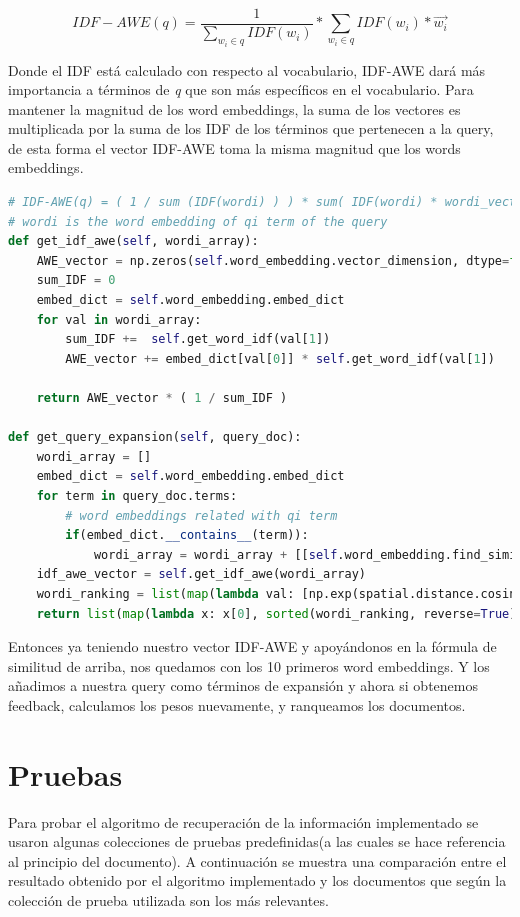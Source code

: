 \documentclass{llncs}
\begin{document}
$$ IDF-AWE(q) = \frac{1}{\sum_{w_i \in q} IDF(w_i)} * \sum_{w_i \in q} IDF(w_i) * \vec{w_i}$$


Donde el IDF está calculado con respecto al vocabulario, IDF-AWE dará más importancia a términos de \textit{q} que son más específicos en el vocabulario. Para mantener la magnitud de los word embeddings, la suma de los vectores es multiplicada por la suma de los IDF de los términos que pertenecen a la query, de esta forma el vector IDF-AWE toma la misma magnitud que los words embeddings.

\begin{lstlisting}[language=Python]
# IDF-AWE(q) = ( 1 / sum (IDF(wordi) ) ) * sum( IDF(wordi) * wordi_vector )
# wordi is the word embedding of qi term of the query
def get_idf_awe(self, wordi_array):
    AWE_vector = np.zeros(self.word_embedding.vector_dimension, dtype=float)
    sum_IDF = 0
    embed_dict = self.word_embedding.embed_dict
    for val in wordi_array:
        sum_IDF +=  self.get_word_idf(val[1])
        AWE_vector += embed_dict[val[0]] * self.get_word_idf(val[1])

    return AWE_vector * ( 1 / sum_IDF )

def get_query_expansion(self, query_doc):
    wordi_array = []
    embed_dict = self.word_embedding.embed_dict
    for term in query_doc.terms:
        # word embeddings related with qi term
        if(embed_dict.__contains__(term)):
            wordi_array = wordi_array + [[self.word_embedding.find_similar_word_kdtree(embed_dict[term])[0], term]]
    idf_awe_vector = self.get_idf_awe(wordi_array)
    wordi_ranking = list(map(lambda val: [np.exp(spatial.distance.cosine(embed_dict[val[0]], idf_awe_vector)), val[0]], wordi_array))
    return list(map(lambda x: x[0], sorted(wordi_ranking, reverse=True)))
\end{lstlisting}

Entonces ya teniendo nuestro vector IDF-AWE y apoyándonos en la fórmula de similitud de arriba, nos quedamos con los 10 primeros word embeddings. Y los añadimos a nuestra query como términos de expansión y ahora si obtenemos feedback, calculamos los pesos nuevamente, y ranqueamos los documentos.

\section{Pruebas}
Para probar el algoritmo de recuperación de la información implementado se usaron algunas colecciones de pruebas predefinidas(a las cuales se hace referencia al principio del documento). A continuación se muestra una comparación entre el resultado obtenido por el algoritmo implementado y los documentos que según la colección de prueba utilizada son los más relevantes.
\end{document}
